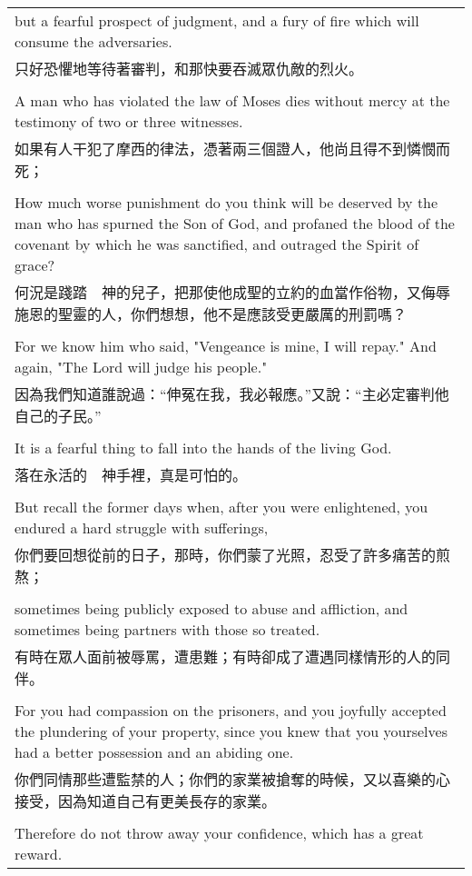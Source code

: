 \documentclass{book}
\begin{document}
\begin{tabularx}{\textwidth}{p{}}
but a fearful prospect of judgment, and a fury of fire which will consume the adversaries. \\
只好恐懼地等待著審判，和那快要吞滅眾仇敵的烈火。 \\ \\
A man who has violated the law of Moses dies without mercy at the testimony of two or three witnesses. \\
如果有人干犯了摩西的律法，憑著兩三個證人，他尚且得不到憐憫而死； \\ \\
How much worse punishment do you think will be deserved by the man who has spurned the Son of God, and profaned the blood of the covenant by which he was sanctified, and outraged the Spirit of grace? \\
何況是踐踏　神的兒子，把那使他成聖的立約的血當作俗物，又侮辱施恩的聖靈的人，你們想想，他不是應該受更嚴厲的刑罰嗎？ \\ \\
For we know him who said, "Vengeance is mine, I will repay." And again, "The Lord will judge his people." \\
因為我們知道誰說過：“伸冤在我，我必報應。”又說：“主必定審判他自己的子民。” \\ \\
It is a fearful thing to fall into the hands of the living God. \\
落在永活的　神手裡，真是可怕的。 \\ \\
But recall the former days when, after you were enlightened, you endured a hard struggle with sufferings, \\
你們要回想從前的日子，那時，你們蒙了光照，忍受了許多痛苦的煎熬； \\ \\
sometimes being publicly exposed to abuse and affliction, and sometimes being partners with those so treated. \\
有時在眾人面前被辱罵，遭患難；有時卻成了遭遇同樣情形的人的同伴。 \\ \\
For you had compassion on the prisoners, and you joyfully accepted the plundering of your property, since you knew that you yourselves had a better possession and an abiding one. \\
你們同情那些遭監禁的人；你們的家業被搶奪的時候，又以喜樂的心接受，因為知道自己有更美長存的家業。 \\ \\
Therefore do not throw away your confidence, which has a great reward. \\

\end{tabularx}
\end{document}
